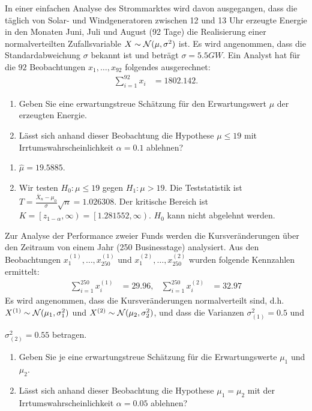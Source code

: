 In einer einfachen Analyse des Strommarktes wird davon ausgegangen, dass die
täglich von Solar- und Windgeneratoren zwischen 12 und 13 Uhr erzeugte Energie
in den Monaten Juni, Juli und August (92 Tage) die Realisierung einer
normalverteilten Zufallsvariable $X\sim\mathcal N(\mu, \sigma^2)$ ist. Es wird
angenommen, dass die Standardabweichung $\sigma$ bekannt ist und beträgt $\sigma=5.5 GW$.
Ein Analyst hat für die $92$ Beobachtungen $x_1,\dots ,x_{92}$ folgendes
ausgerechnet:
\begin{align*}
    \sum_{i=1}^{92} x_i &= 1802.142.
\end{align*}
\begin{enumerate}
    \item Geben Sie eine erwartungstreue Schätzung für den Erwartungswert $\mu$
        der erzeugten Energie.
    \item Lässt sich anhand dieser Beobachtung die Hypothese $\mu\leq 19$
        mit Irrtumswahrscheinlichkeit $\alpha=0.1$ ablehnen?
\end{enumerate}

\solution
\begin{enumerate}
    \item $\hat{\mu} = 19.5885$.
    \item Wir testen $H_0: \mu\leq 19$ gegen $H_1: \mu> 19$. Die Teststatistik ist
        $T = \frac{\bar X_n - \mu_{0}}{\sigma}\sqrt{n} = 1.026308$. Der
        kritische Bereich ist $K = \left[ z_{1-\alpha},\infty\right) = \left[
            1.281552, \infty \right)$. $H_0$ kann nicht abgelehnt werden.
\end{enumerate}


Zur Analyse der Performance zweier Funds werden die Kursveränderungen über den
Zeitraum von einem Jahr (250 Businesstage) analysiert. Aus den Beobachtungen
$x^{(1)}_{1},\dots ,x^{(1)}_{250}$ und $x^{(2)}_{1},\dots ,x^{(2)}_{250}$
wurden folgende Kennzahlen ermittelt:
\begin{align*}
    \sum_{i=1}^{250} x^{(1)}_i &= 29.96, & \sum_{i=1}^{250} x^{(2)}_{i} &= 32.97
\end{align*}
Es wird angenommen, dass die Kursveränderungen normalverteilt sind, d.h.\
$X^{(1)}\sim \mathcal N(\mu_1, \sigma_1^{2})$ und $X^{(2)}\sim\mathcal N(\mu_2,
\sigma_2^{2})$, und dass die Varianzen $\sigma_{(1)}^{2}=0.5$ und

$\sigma^{2}_{(2)}=0.55$ betragen.
\begin{enumerate}
    \item Geben Sie je eine erwartungstreue Schätzung für die Erwartungswerte
        $\mu_1$ und $\mu_2$. 
    \item Lässt sich anhand dieser Beobachtung die Hypothese $\mu_1 = \mu_2$
        mit der Irrtumswahrscheinlichkeit $\alpha=0.05$ ablehnen?
\end{enumerate}

